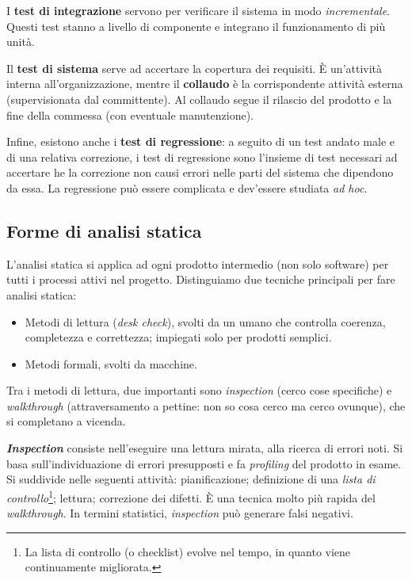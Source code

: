 \documentclass[a4paper]{article}
\begin{document}
I \textbf{test di integrazione} servono per verificare il sistema in modo \emph{incrementale}. Questi test stanno a livello di componente e integrano il funzionamento di più unità.
		
Il \textbf{test di sistema} serve ad accertare la copertura dei requisiti. È un'attività interna all'organizzazione, mentre il \textbf{collaudo} è la corrispondente attività esterna (supervisionata dal committente). Al collaudo segue il rilascio del prodotto e la fine della commessa (con eventuale manutenzione).
		
Infine, esistono anche i \textbf{test di regressione}: a seguito di un test andato male e di una relativa correzione, i test di regressione sono l'insieme di test necessari ad accertare he la correzione non causi errori nelle parti del sistema che dipendono da essa. La regressione può essere complicata e dev'essere studiata \emph{ad hoc}.

		
	\subsection{Forme di analisi statica}

		
L'analisi statica si applica ad ogni prodotto intermedio (non solo software) per tutti i processi attivi nel progetto. Distinguiamo due tecniche principali per fare analisi statica:
		
	\begin{itemize}
		
			
	\item Metodi di lettura (\emph{desk check}), svolti da un umano che controlla coerenza, completezza e correttezza; impiegati solo per prodotti semplici.
			
	\item Metodi formali, svolti da macchine.
		
	\end{itemize}

		
Tra i metodi di lettura, due importanti sono \emph{inspection} (cerco cose specifiche) e \emph{walkthrough} (attraversamento a pettine: non so cosa cerco ma cerco ovunque), che si completano a vicenda.
		
\textbf{\emph{Inspection}} consiste nell'eseguire una lettura mirata, alla ricerca di errori noti. Si basa sull'individuazione di errori presupposti e fa \emph{profiling} del prodotto in esame. Si suddivide nelle seguenti attività: pianificazione; definizione di una \emph{lista di controllo}\footnote{La lista di controllo (o checklist) evolve nel tempo, in quanto viene continuamente migliorata.}; lettura; correzione dei difetti. È una tecnica molto più rapida del \emph{walkthrough}. In termini statistici, \emph{inspection} può generare falsi negativi.
		
\end{document}

